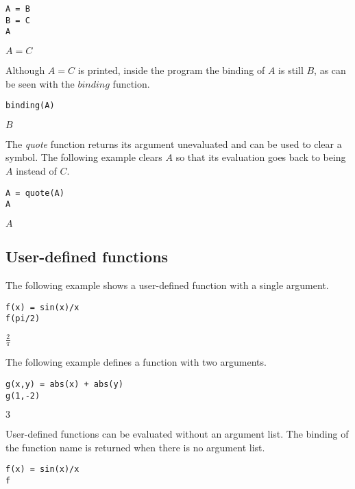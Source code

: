 \begin{Verbatim}[formatcom=\color{blue}]
A = B
B = C
A
\end{Verbatim}

\noindent
$\displaystyle A=C$

\bigskip
\noindent
Although $A=C$ is printed,
inside the program the binding of $A$ is still $B$, as can be seen with
the $binding$ function.

\begin{Verbatim}[formatcom=\color{blue}]
binding(A)
\end{Verbatim}

\noindent
$\displaystyle B$

\bigskip
\noindent
The {\it quote} function returns its argument unevaluated
and can be used to clear a symbol.
The following example clears $A$ so that its evaluation goes back to
being $A$ instead of $C$.

\begin{Verbatim}[formatcom=\color{blue}]
A = quote(A)
A
\end{Verbatim}

\noindent
$\displaystyle A$

\subsection{User-defined functions}

The following example shows
a user-defined function with a single argument.

\begin{Verbatim}[formatcom=\color{blue}]
f(x) = sin(x)/x
f(pi/2)
\end{Verbatim}

\noindent
$\displaystyle \frac{2}{\pi}$

\bigskip
\noindent
The following example defines a function with two arguments.

\begin{Verbatim}[formatcom=\color{blue}]
g(x,y) = abs(x) + abs(y)
g(1,-2)
\end{Verbatim}

\noindent
$\displaystyle 3$

\bigskip
\noindent
User-defined functions can be evaluated without an argument list.
The binding of the function name is returned when there is no
argument list.

\begin{Verbatim}[formatcom=\color{blue}]
f(x) = sin(x)/x
f
\end{Verbatim}


